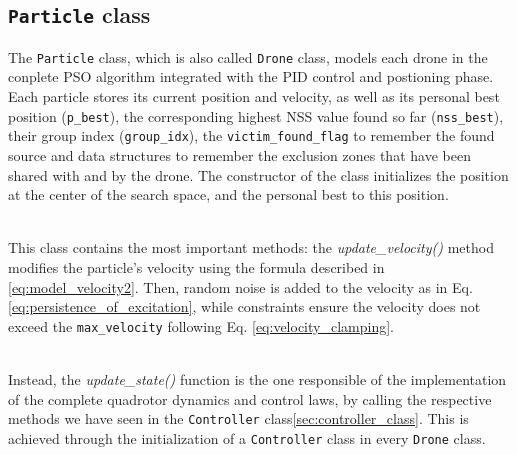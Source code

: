 \subsection{\texttt{Particle} class}
The \texttt{Particle} class, which is also called \texttt{Drone} 
class, models each drone in the conplete PSO algorithm integrated with the PID
control and postioning phase. 
\noindent\\
Each particle stores its current 
position and velocity, as well as its personal 
best position (\texttt{p\_best}), the corresponding
highest NSS value found so far (\texttt{nss\_best}), 
their group index (\texttt{group\_idx}), 
the \texttt{victim\_found\_flag} to remember the found source and 
data structures to remember the exclusion zones 
that have been shared with and by the drone.
The constructor of the class initializes the position 
at the center of the search space, and the personal best
to this position.

\noindent\\
This class contains the most important 
methods: the \textit{update\_velocity()} method modifies the 
particle's velocity using the formula described
in \ref{eq:model_velocity2}. Then, random noise is 
added to the velocity as in Eq.\ref{eq:persistence_of_excitation},
while constraints ensure the velocity does not 
exceed the \texttt{max\_velocity} following Eq. \ref{eq:velocity_clamping}.

\noindent\\
Instead, the \textit{update\_state()} function is the one responsible
of the implementation of the complete quadrotor dynamics
and control laws, by calling the respective methods we have seen 
in the \texttt{Controller} class\ref{sec:controller_class}.
This is achieved through the initialization of a \texttt{Controller}
class in every \texttt{Drone} class.

